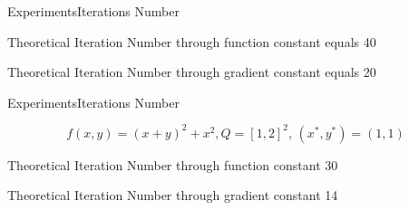 \documentclass{beamer}
\begin{document}
\begin{frame}{Experiments}{Iterations Number}


Theoretical Iteration Number through function constant equals 40

Theoretical Iteration Number through gradient constant equals 20
\pause
\begin{figure}[h!]
\label{fig:image}
\end{figure}
\end{frame}

\begin{frame}{Experiments}{Iterations Number}

$$f(x,y) = (x+y)^2+x^2, Q = [1,2]^2,\,(x^*, y^*) = (1,1)$$

Theoretical Iteration Number through function constant 30

Theoretical Iteration Number through gradient constant 14

\pause

\begin{figure}[h!]
\label{fig:image}
\end{figure}
\end{frame}
\end{document}
